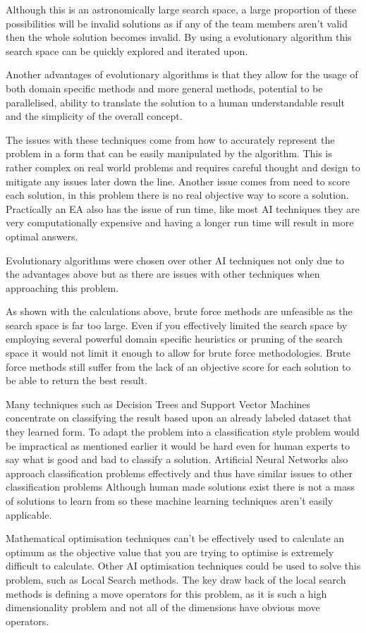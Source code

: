 \documentclass[a4paper]{article}
\begin{document}
\par
Although this is an astronomically large search space, a large proportion of these possibilities will be invalid solutions as if any of the team members aren't valid then the whole solution becomes invalid.
By using a evolutionary algorithm this search space can be quickly explored and iterated upon.
\par
Another advantages of evolutionary algorithms is that they allow for the usage of both domain specific methods and more general methods, potential to be parallelised, ability to translate the solution to a human understandable result and the simplicity of the overall concept.
\\ \par
The issues with these techniques come from how to accurately represent the problem in a form that can be easily manipulated by the algorithm.
This is rather complex on real world problems and requires careful thought and design to mitigate any issues later down the line.
Another issue comes from need to score each solution, in this problem there is no real objective way to score a solution.
Practically an EA also has the issue of run time, like most AI techniques they are very computationally expensive and having a longer run time will result in more optimal answers.
\\ \par
Evolutionary algorithms were chosen over other AI techniques not only due to the advantages above but as there are issues with other techniques when approaching this problem.
\par
As shown with the calculations above, brute force methods are unfeasible as the search space is far too large.
Even if you effectively limited the search space by employing several powerful domain specific heuristics or pruning of the search space it would not limit it enough to allow for brute force methodologies.
Brute force methods still suffer from the lack of an objective score for each solution to be able to return the best result.
\par
Many techniques such as Decision Trees and Support Vector Machines concentrate on classifying the result based upon an already labeled dataset that they learned form.
To adapt the problem into a classification style problem would be impractical as mentioned earlier it would be hard even for human experts to say what is good and bad to classify a solution.
Artificial Neural Networks also approach classification problems effectively and thus have similar issues to other classification problems
Although human made solutions exist there is not a mass of solutions to learn from so these machine learning techniques aren't easily applicable.
\par
Mathematical optimisation techniques can't be effectively used to calculate an optimum as the objective value that you are trying to optimise is extremely difficult to calculate.
Other AI optimisation techniques could be used to solve this problem, such as Local Search methods.
The key draw back of the local search methods is defining a move operators for this problem, as it is such a high dimensionality problem and not all of the dimensions have obvious move operators.
\end{document}
